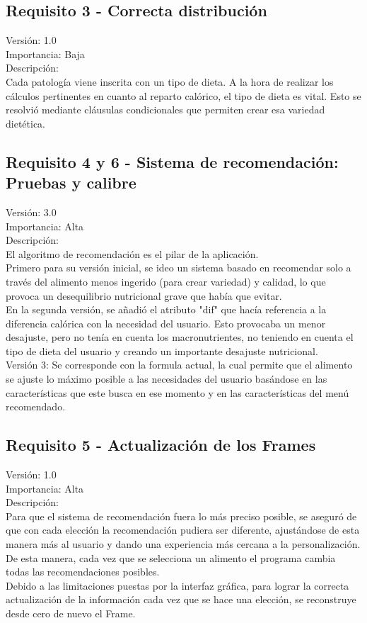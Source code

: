 \subsection{Requisito 3 - Correcta distribución}
Versión: 1.0\\
Importancia: Baja\\
Descripción:\\
Cada patología viene inscrita con un tipo de dieta. A la hora de realizar los cálculos pertinentes en cuanto al reparto calórico, el tipo de dieta es vital. Esto se resolvió mediante cláusulas condicionales que permiten crear esa variedad dietética.
\subsection{Requisito 4 y 6 - Sistema de recomendación: Pruebas y calibre}
Versión: 3.0\\
Importancia: Alta\\
Descripción:\\
El algoritmo de recomendación es el pilar de la aplicación. \\
Primero para su versión inicial, se ideo un sistema basado en recomendar solo a través del alimento menos ingerido (para crear variedad) y calidad, lo que provoca un desequilibrio nutricional grave que había que evitar.\\
En la segunda versión, se añadió el atributo "dif" que hacía referencia a la diferencia calórica con la necesidad del usuario. Esto provocaba un menor desajuste, pero no tenía en cuenta los macronutrientes, no teniendo en cuenta el tipo de dieta del usuario y creando un importante desajuste nutricional.\\
Versión 3: Se corresponde con la formula actual, la cual permite que el alimento se ajuste lo máximo posible a las necesidades del usuario basándose en las características que este busca en ese momento y en las características del menú recomendado.
\subsection{Requisito 5 - Actualización de los Frames}
Versión: 1.0\\
Importancia: Alta\\
Descripción:\\
Para que el sistema de recomendación fuera lo más preciso posible, se aseguró de que con cada elección la recomendación pudiera ser diferente, ajustándose de esta manera más al usuario y dando una experiencia más cercana a la personalización. De esta manera, cada vez que se selecciona un alimento el programa cambia todas las recomendaciones posibles.\\
Debido a las limitaciones puestas por la interfaz gráfica, para lograr la correcta actualización de la información cada vez que se hace una elección, se reconstruye desde cero de nuevo el Frame.

